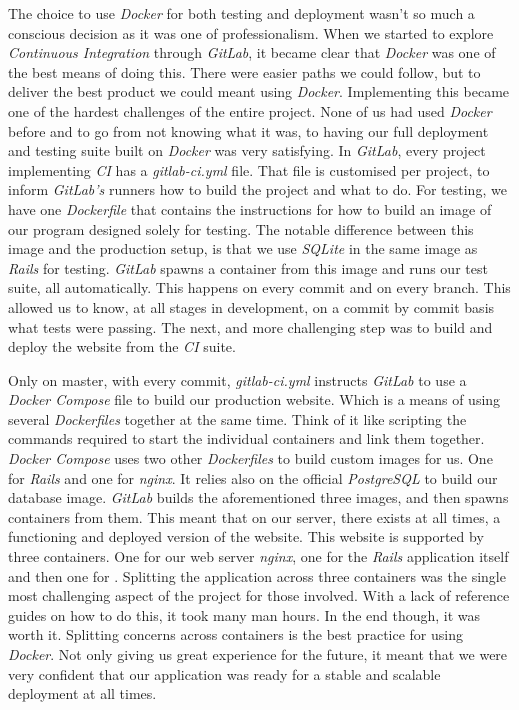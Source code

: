 \documentclass{l3proj}
\begin{document}
The choice to use \textit{Docker} for both testing and deployment wasn't so much a conscious decision as it was one of professionalism. When we started to explore \textit{Continuous Integration} through \textit{GitLab}, it became clear that \textit{Docker} was one of the best means of doing this. There were easier paths we could follow, but to deliver the best product we could meant using \textit{Docker}. Implementing this became one of the hardest challenges of the entire project. None of us had used \textit{Docker} before and to go from not knowing what it was, to having our full deployment and testing suite built on \textit{Docker} was very satisfying. In \textit{GitLab}, every project implementing \textit{CI} has a \textit{gitlab-ci.yml} file. That file is customised per project, to inform \textit{GitLab's} runners how to build the project and what to do. For testing, we have one \textit{Dockerfile} that contains the instructions for how to build an image of our program designed solely for testing. The notable difference between this image and the production setup, is that we use \textit{SQLite} in the same image as \textit{Rails} for testing. \textit{GitLab} spawns a container from this image and runs our test suite, all automatically. This happens on every commit and on every branch. This allowed us to know, at all stages in development, on a commit by commit basis what tests were passing. The next, and more challenging step was to build and deploy the website from the \textit{CI} suite.

Only on master, with every commit, \textit{gitlab-ci.yml} instructs \textit{GitLab} to use a \textit{Docker Compose} file to build our production website. Which is a means of using several \textit{Dockerfiles} together at the same time. Think of it like scripting the commands required to start the individual containers and link them together. \textit{Docker Compose} uses two other \textit{Dockerfiles} to build custom images for us. One for \textit{Rails} and one for \textit{nginx}. It relies also on the official \textit{PostgreSQL} to build our database image. \textit{GitLab} builds the aforementioned three images, and then spawns containers from them. This meant that on our server, there exists at all times, a functioning and deployed version of the website. This website is supported by three containers. One for our web server \textit{nginx}, one for the \textit{Rails} application itself and then one for \textit{}. Splitting the application across three containers was the single most challenging aspect of the project for those involved. With a lack of reference guides on how to do this, it took many man hours. In the end though, it was worth it. Splitting concerns across containers is the best practice for using \textit{Docker}. Not only giving us great experience for the future, it meant that we were very confident that our application was ready for a stable and scalable deployment at all times.
\end{document}
